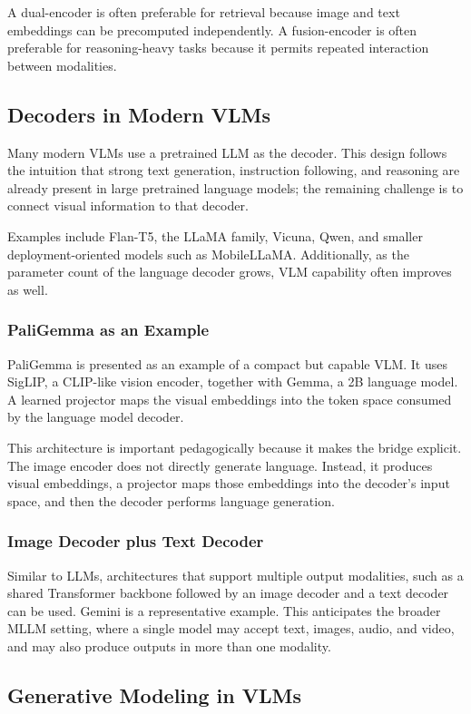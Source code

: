 \documentclass{article}
\begin{document}
A dual-encoder is often preferable for retrieval because image and text embeddings can be precomputed independently. A fusion-encoder is often preferable for reasoning-heavy tasks because it permits repeated interaction between modalities.

\subsection{Decoders in Modern VLMs}
Many modern VLMs use a pretrained LLM as the decoder. This design follows the intuition that strong text generation, instruction following, and reasoning are already present in large pretrained language models; the remaining challenge is to connect visual information to that decoder.

Examples include Flan-T5, the LLaMA family, Vicuna, Qwen, and smaller deployment-oriented models such as MobileLLaMA. Additionally, as the parameter count of the language decoder grows, VLM capability often improves as well.

\subsubsection{PaliGemma as an Example}
PaliGemma is presented as an example of a compact but capable VLM. It uses SigLIP, a CLIP-like vision encoder, together with Gemma, a 2B language model. A learned projector maps the visual embeddings into the token space consumed by the language model decoder.

This architecture is important pedagogically because it makes the bridge explicit. The image encoder does not directly generate language. Instead, it produces visual embeddings, a projector maps those embeddings into the decoder's input space, and then the decoder performs language generation.

\subsubsection{Image Decoder plus Text Decoder}
Similar to LLMs, architectures that support multiple output modalities, such as a shared Transformer backbone followed by an image decoder and a text decoder can be used. Gemini is a representative example. This anticipates the broader MLLM setting, where a single model may accept text, images, audio, and video, and may also produce outputs in more than one modality.

\subsection{Generative Modeling in VLMs}
\end{document}
